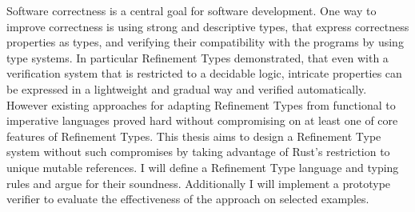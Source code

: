 
\Abstract

Software correctness is a central goal for software development.
One way to improve correctness is using strong and descriptive types, that express correctness properties as types, and verifying their compatibility with the programs by using type systems.
In particular Refinement Types demonstrated, that even with a verification system that is restricted to a decidable logic, intricate properties can be expressed in a lightweight and gradual way and verified automatically.
However existing approaches for adapting Refinement Types from functional to imperative languages proved hard without compromising on at least one of core features of Refinement Types.
This thesis aims to design a Refinement Type system without such compromises by taking advantage of Rust's restriction to unique mutable references.
I will define a Refinement Type language and typing rules and argue for their soundness. Additionally I will implement a prototype verifier to evaluate the effectiveness of the approach on selected examples.

